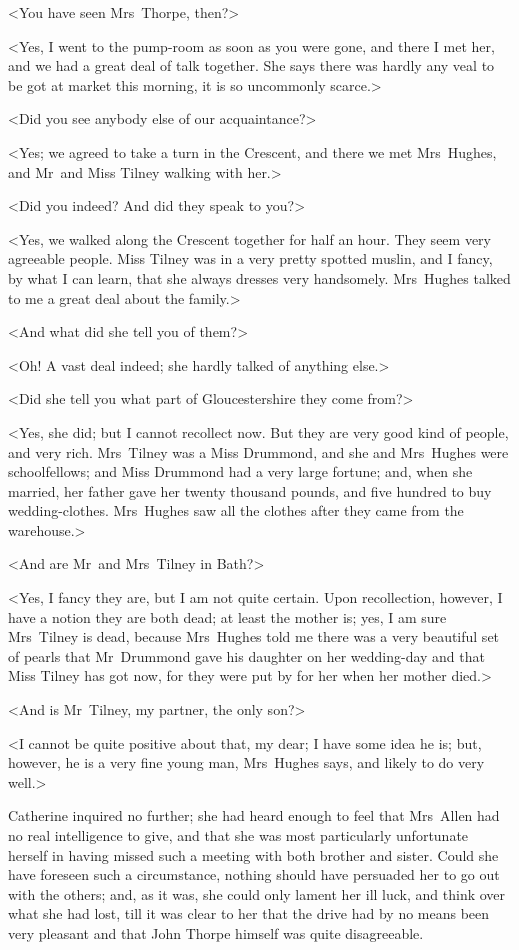  <You have seen Mrs~Thorpe, then?> 

 <Yes, I went to the pump-room as soon as you were gone, and there I met her, and we had a great deal of talk together. She says there was hardly any veal to be got at market this morning, it is so uncommonly scarce.> 

 <Did you see anybody else of our acquaintance?> 

 <Yes; we agreed to take a turn in the Crescent, and there we met Mrs~Hughes, and Mr~and Miss Tilney walking with her.> 

 <Did you indeed? And did they speak to you?> 

 <Yes, we walked along the Crescent together for half an hour. They seem very agreeable people. Miss Tilney was in a very pretty spotted muslin, and I fancy, by what I can learn, that she always dresses very handsomely. Mrs~Hughes talked to me a great deal about the family.> 

 <And what did she tell you of them?> 

 <Oh! A vast deal indeed; she hardly talked of anything else.> 

 <Did she tell you what part of Gloucestershire they come from?> 

 <Yes, she did; but I cannot recollect now. But they are very good kind of people, and very rich. Mrs~Tilney was a Miss Drummond, and she and Mrs~Hughes were schoolfellows; and Miss Drummond had a very large fortune; and, when she married, her father gave her twenty thousand pounds, and five hundred to buy wedding-clothes. Mrs~Hughes saw all the clothes after they came from the warehouse.> 

 <And are Mr~and Mrs~Tilney in Bath?> 

 <Yes, I fancy they are, but I am not quite certain. Upon recollection, however, I have a notion they are both dead; at least the mother is; yes, I am sure Mrs~Tilney is dead, because Mrs~Hughes told me there was a very beautiful set of pearls that Mr~Drummond gave his daughter on her wedding-day and that Miss Tilney has got now, for they were put by for her when her mother died.> 

 <And is Mr~Tilney, my partner, the only son?> 

 <I cannot be quite positive about that, my dear; I have some idea he is; but, however, he is a very fine young man, Mrs~Hughes says, and likely to do very well.> 

 Catherine inquired no further; she had heard enough to feel that Mrs~Allen had no real intelligence to give, and that she was most particularly unfortunate herself in having missed such a meeting with both brother and sister. Could she have foreseen such a circumstance, nothing should have persuaded her to go out with the others; and, as it was, she could only lament her ill luck, and think over what she had lost, till it was clear to her that the drive had by no means been very pleasant and that John Thorpe himself was quite disagreeable. 